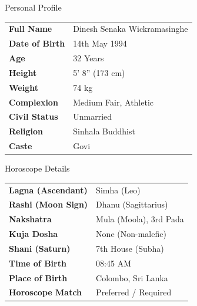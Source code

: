 \documentclass[11pt,a4paper]{article}
\begin{document}
\begin{minipage}[t]{0.485\textwidth}
  \begin{biodatabox}{Personal Profile}
    \renewcommand{\arraystretch}{1.2}
    \begin{tabularx}{\linewidth}{@{}l X@{}}
      \textbf{Full Name} & Dinesh Senaka Wickramasinghe \\
      \textbf{Date of Birth} & 14th May 1994 \\
      \textbf{Age} & 32 Years \\
      \textbf{Height} & 5' 8'' (173 cm) \\
      \textbf{Weight} & 74 kg \\
      \textbf{Complexion} & Medium Fair, Athletic \\
      \textbf{Civil Status} & Unmarried \\
      \textbf{Religion} & Sinhala Buddhist \\
      \textbf{Caste} & Govi \\
    \end{tabularx}
  \end{biodatabox}
\end{minipage}\hfill
\begin{minipage}[t]{0.485\textwidth}
  \begin{biodatabox}{Horoscope Details}
    \renewcommand{\arraystretch}{1.2}
    \begin{tabularx}{\linewidth}{@{}l X@{}}
      \textbf{Lagna (Ascendant)} & Simha (Leo) \\
      \textbf{Rashi (Moon Sign)} & Dhanu (Sagittarius) \\
      \textbf{Nakshatra} & Mula (Moola), 3rd Pada \\
      \textbf{Kuja Dosha} & None (Non-malefic) \\
      \textbf{Shani (Saturn)} & 7th House (Subha) \\
      \textbf{Time of Birth} & 08:45 AM \\
      \textbf{Place of Birth} & Colombo, Sri Lanka \\
      \textbf{Horoscope Match} & Preferred / Required \\
    \end{tabularx}
  \end{biodatabox}
\end{minipage}
\par

\vspace{0.2cm}
\end{document}
